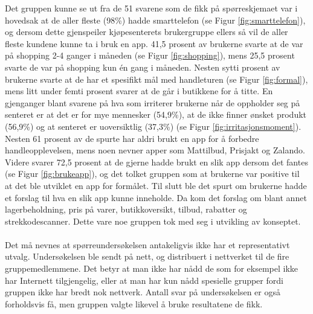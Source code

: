 Det gruppen kunne se ut fra de 51 svarene som de fikk på spørreskjemaet var i hovedsak at de aller fleste (98\%) hadde smarttelefon (se Figur \ref{fig:smarttelefon}), og dersom dette gjenspeiler kjøpesenterets brukergruppe ellers så vil de aller fleste kundene kunne ta i bruk en app. 41,5 prosent av brukerne svarte at de var på shopping 2-4 ganger i måneden (se Figur \ref{fig:shopping}), mens 25,5 prosent svarte de var på shopping kun én gang i måneden. Nesten sytti prosent av brukerne svarte at de har et spesifikt mål med handleturen (se Figur \ref{fig:formal}), mens litt under femti prosent svarer at de går i butikkene for å titte. En gjenganger blant svarene på hva som irriterer brukerne når de oppholder seg på senteret er at det er for mye mennesker (54,9\%), at de ikke finner ønsket produkt (56,9\%) og at senteret er uoversiktlig (37,3\%) (se Figur \ref{fig:irritasjonsmoment}). Nesten 61 prosent av de spurte har aldri brukt en app for å forbedre handleopplevelsen, mens noen nevner apper som Mattilbud, Prisjakt og Zalando. Videre svarer 72,5 prosent at de gjerne hadde brukt en slik app dersom det fantes (se Figur \ref{fig:brukeapp}), og det tolket gruppen som at brukerne var positive til at det ble utviklet en app for formålet. Til slutt ble det spurt om brukerne hadde et forslag til hva en slik app kunne inneholde. Da kom det forslag om blant annet lagerbeholdning, pris på varer, butikkoversikt, tilbud, rabatter og strekkodescanner. Dette vare noe gruppen tok med seg i utvikling av konseptet.
\\\\
Det må nevnes at spørreundersøkelsen antakeligvis ikke har et representativt utvalg. Undersøkelsen ble sendt på nett, og distribuert i nettverket til de fire gruppemedlemmene. Det betyr at man ikke har nådd de som for eksempel ikke har Internett tilgjengelig, eller at man har kun nådd spesielle grupper fordi gruppen ikke har bredt nok nettverk. Antall svar på undersøkelsen er også forholdsvis få, men gruppen valgte likevel å bruke resultatene de fikk. 


